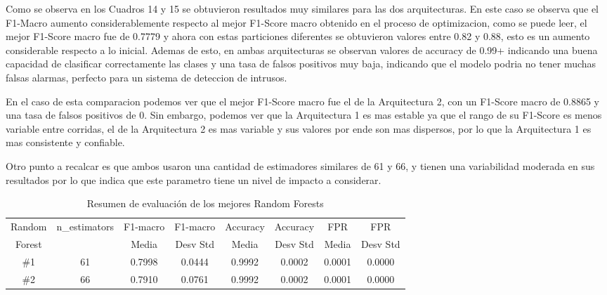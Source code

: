 \documentclass[12pt,a4paper]{article}
\begin{document}
Como se observa en los Cuadros 14 y 15 se obtuvieron resultados muy similares para las dos arquitecturas.
En este caso se observa que el F1-Macro aumento considerablemente respecto al mejor F1-Score macro
obtenido en el proceso de optimizacion, como se puede leer, el mejor F1-Score macro fue de 0.7779 y ahora
con estas particiones diferentes se obtuvieron valores entre 0.82 y 0.88, esto es un aumento considerable respecto
a lo inicial. Ademas de esto, en ambas arquitecturas se observan valores de accuracy de 0.99+ indicando una buena
capacidad de clasificar correctamente las clases y una tasa de falsos positivos muy baja, indicando que
el modelo podria no tener muchas falsas alarmas, perfecto para un sistema de deteccion de intrusos.

En el caso de esta comparacion podemos ver que el mejor F1-Score macro fue el de la Arquitectura 2,
con un F1-Score macro de 0.8865 y una tasa de falsos positivos de 0. Sin embargo, podemos ver que la Arquitectura 1
es mas estable ya que el rango de su F1-Score es menos variable entre corridas, el de la Arquitectura 2 es mas variable
y sus valores por ende son mas dispersos, por lo que la Arquitectura 1 es mas consistente y confiable.

Otro punto a recalcar es que ambos usaron una cantidad de estimadores similares de 61 y 66, y tienen
una variabilidad moderada en sus resultados por lo que indica que este parametro tiene un nivel de impacto a considerar.

\begin{table}[htbp]
  \centering
  \small
  \begin{tabular}{cccccccc}
    \hline
    Random & n\_estimators & F1-macro & F1-macro & Accuracy & Accuracy & FPR & FPR \\
    Forest &  & Media & Desv Std & Media & Desv Std & Media & Desv Std \\
    \hline
    \#1 & 61 & 0.7998 & 0.0444 & 0.9992 & 0.0002 & 0.0001 & 0.0000 \\
    \#2 & 66 & 0.7910 & 0.0761 & 0.9992 & 0.0002 & 0.0001 & 0.0000 \\
    \hline
  \end{tabular}
  \caption{Resumen de evaluación de los mejores Random Forests}
  \label{tab:rf-resumen-evaluacion}
\end{table}
\end{document}
